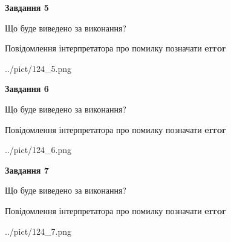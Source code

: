 \documentclass[10pt, ukrainian]{article}
\begin{document}
{\begin {large}
{\begin {center}\textbf{Завдання 5}\end {center}}\par
Що буде виведено за виконання? \par
Повідомлення інтерпретатора про помилку позначати \textbf{error}

\begin{center}
	{../pict/124_5.png}
\end{center}
\newpage

{\begin {center}\textbf{Завдання 6}\end {center}}\par
Що буде виведено за виконання? \par
Повідомлення інтерпретатора про помилку позначати \textbf{error}

\begin{center}
	{../pict/124_6.png}
\end{center}
\newpage

{\begin {center}\textbf{Завдання 7}\end {center}}\par
Що буде виведено за виконання? \par
Повідомлення інтерпретатора про помилку позначати \textbf{error}

\begin{center}
	{../pict/124_7.png}
\end{center}
\newpage

\end {large}}
\end{document}
